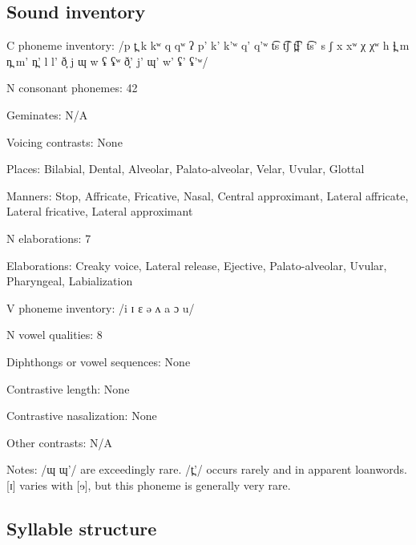 {\subsection*{Sound inventory}
\begin{appendixdesc}

\item[C phoneme inventory:] /p t̪ k kʷ q qʷ ʔ p’ k’ k’ʷ q’ q’ʷ t͡s t͡ʃ t̪͡ɬ’ t͡s’ s ʃ x xʷ χ χʷ h ɬ̪ m n̪ m’ n̪’ l l’ ð̞ j ɰ w ʢ ʢʷ ð̞’ j’ ɰ’ w’ ʢ’ ʢ’ʷ/

\item[N consonant phonemes:] 42

\item[Geminates:] N/A

\item[Voicing contrasts:] None

\item[Places:] Bilabial, Dental, Alveolar, Palato-alveolar, Velar, Uvular, Glottal 

\item[Manners:] Stop, Affricate, Fricative, Nasal, Central approximant, Lateral affricate, Lateral fricative, Lateral approximant

\item[N elaborations:] 7

\item[Elaborations:] Creaky voice, Lateral release, Ejective, Palato-alveolar, Uvular, Pharyngeal, Labialization

\item[V phoneme inventory:] /i ɪ ɛ ə ʌ a ɔ u/

\item[N vowel qualities:] 8

\item[Diphthongs or vowel sequences:] None

\item[Contrastive length:] None

\item[Contrastive nasalization:] None

\item[Other contrasts:] N/A

\item[Notes:] /ɰ ɰ’/ are exceedingly rare. /t̪’/ occurs rarely and in apparent loanwords. [ɪ] varies with [ɘ], but this phoneme is generally very rare.
\end{appendixdesc}
\subsection*{Syllable structure}
\begin{appendixdesc}


\end{appendixdesc}}
